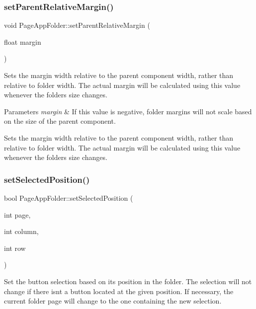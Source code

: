 \subsubsection{\texorpdfstring{set\+Parent\+Relative\+Margin()}{setParentRelativeMargin()}}
{\footnotesize\ttfamily void Page\+App\+Folder\+::set\+Parent\+Relative\+Margin (\begin{DoxyParamCaption}\item[{float}]{margin }\end{DoxyParamCaption})}

Sets the margin width relative to the parent component width, rather than relative to folder width. The actual margin will be calculated using this value whenever the folder\textquotesingle{}s size changes.


\begin{DoxyParams}{Parameters}
{\em margin} & If this value is negative, folder margins will not scale based on the size of the parent component.\\
\hline
\end{DoxyParams}
Sets the margin width relative to the parent component width, rather than relative to folder width. The actual margin will be calculated using this value whenever the folder\textquotesingle{}s size changes. \mbox{\label{classPageAppFolder_a81ecc480e6b29644cc0c39f397df21d5}} 
\subsubsection{\texorpdfstring{set\+Selected\+Position()}{setSelectedPosition()}}
{\footnotesize\ttfamily bool Page\+App\+Folder\+::set\+Selected\+Position (\begin{DoxyParamCaption}\item[{int}]{page,  }\item[{int}]{column,  }\item[{int}]{row }\end{DoxyParamCaption})}

Set the button selection based on its position in the folder. The selection will not change if there isn\textquotesingle{}t a button located at the given position. If necessary, the current folder page will change to the one containing the new selection.


